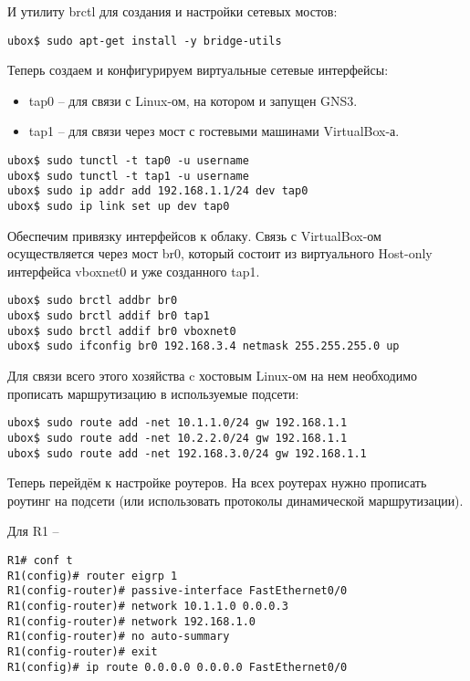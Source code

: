 \documentclass[a4paper, 12pt]{article}		%
\begin{document}
И утилиту brctl для создания и настройки сетевых мостов:
\begin{Verbatim}[frame=single]
ubox$ sudo apt-get install -y bridge-utils
\end{Verbatim}

Теперь создаем и конфигурируем виртуальные сетевые интерфейсы:
\begin{itemize}
\item tap0 -- для связи с Linux-ом, на котором и запущен GNS3.
\item tap1 -- для связи через мост с гостевыми машинами VirtualBox-а.
\end{itemize}
\begin{Verbatim}[frame=single]
ubox$ sudo tunctl -t tap0 -u username
ubox$ sudo tunctl -t tap1 -u username
ubox$ sudo ip addr add 192.168.1.1/24 dev tap0
ubox$ sudo ip link set up dev tap0
\end{Verbatim}

Обеспечим привязку интерфейсов к облаку. Связь с VirtualBox-ом осуществляется через мост br0, который состоит из виртуального Host-only интерфейса vboxnet0 и уже созданного tap1.
\begin{Verbatim}[frame=single]
ubox$ sudo brctl addbr br0
ubox$ sudo brctl addif br0 tap1
ubox$ sudo brctl addif br0 vboxnet0
ubox$ sudo ifconfig br0 192.168.3.4 netmask 255.255.255.0 up
\end{Verbatim}

Для связи всего этого хозяйства c хостовым Linux-ом на нем необходимо прописать маршрутизацию в используемые подсети:
\begin{Verbatim}[frame=single]
ubox$ sudo route add -net 10.1.1.0/24 gw 192.168.1.1
ubox$ sudo route add -net 10.2.2.0/24 gw 192.168.1.1
ubox$ sudo route add -net 192.168.3.0/24 gw 192.168.1.1
\end{Verbatim}

Теперь перейдём к настройке роутеров. На всех роутерах нужно прописать роутинг на подсети (или использовать протоколы динамической маршрутизации).

Для R1 --

\begin{Verbatim}[frame=single]
R1# conf t
R1(config)# router eigrp 1
R1(config-router)# passive-interface FastEthernet0/0
R1(config-router)# network 10.1.1.0 0.0.0.3
R1(config-router)# network 192.168.1.0
R1(config-router)# no auto-summary
R1(config-router)# exit
R1(config)# ip route 0.0.0.0 0.0.0.0 FastEthernet0/0
\end{Verbatim}
\end{document}
